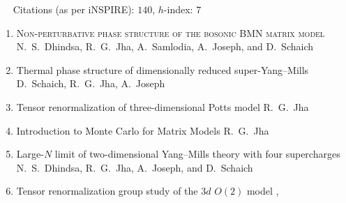  {\faLeanpub}
~~ Citations (as per iNSPIRE): $140$, $h$-index: $7$
\begin{enumerate}
\item \textsc{Non-perturbative phase structure of the bosonic BMN matrix model}  \newline 
\hfill  \texttt{\textbf{}} \newline 
N.~S.~Dhindsa, R.~G.~Jha, A.~Samlodia, A.~Joseph, and D.~Schaich
\vspace{1mm} 
\item Thermal phase structure of dimensionally reduced super-Yang--Mills \newline 
\texttt{\textbf{}} \newline 
D.~Schaich, R.~G.~Jha, A.~Joseph
\vspace{1mm} 
\item Tensor renormalization of three-dimensional Potts model  \newline 
\texttt{\textbf{}} \newline 
R.~G.~Jha
\vspace{1mm} 
 \item Introduction to Monte Carlo for Matrix Models \newline 
 \texttt{\textbf{}} \newline 
 R.~G.~Jha
 \vspace{1mm} 
 \item Large-$N$ limit of two-dimensional Yang--Mills theory with four supercharges \newline 
 \texttt{\textbf{}} \newline 
 N.~S.~Dhindsa, R.~G.~Jha, A.~Joseph, and D.~Schaich
 \vspace{1mm}  
 \item Tensor renormalization group study of the $3d$ $O(2)$ model \newline 
  \texttt{\textbf{}}, \texttt{\textbf{}} \newline 

\end{enumerate}
